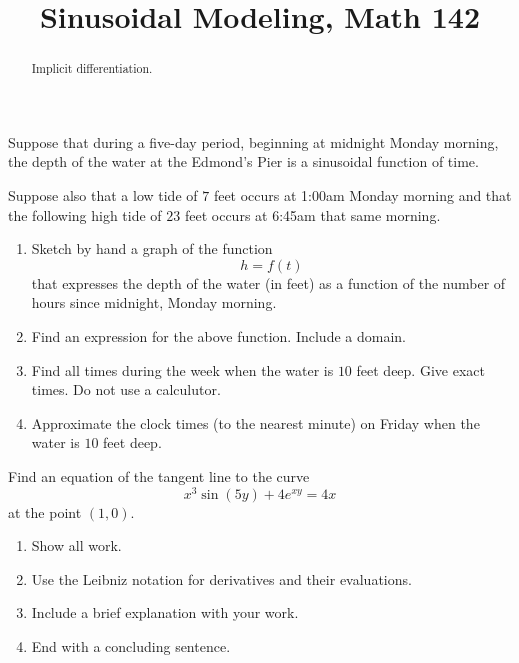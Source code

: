 \documentclass{ximera}
\title{Sinusoidal Modeling, Math 142}
\begin{document}
\begin{abstract}
Implicit differentiation.
\end{abstract}
\maketitle



\begin{question} \label{Qhhjklfghjfd}
Suppose that during a five-day period, beginning at midnight Monday morning, the depth of the water at the Edmond's Pier is a sinusoidal function of time.

Suppose also that a low tide of $7$ feet occurs at 1:00am Monday morning and that the following high tide of $23$ feet occurs at 6:45am that same morning.  

\begin{enumerate}
\item Sketch by hand a graph of the function
\[
   h = f(t)
\] 
that expresses the depth of the water (in feet) as a function of the number of hours since midnight, Monday morning.

\item Find an expression for the above function. Include a domain.

\item Find all times during the week when the water is $10$ feet deep. Give exact times. Do not use a calculutor.

\item Approximate the clock times (to the nearest minute) on Friday when the water is $10$ feet deep.

\end{enumerate}
\end{question}


\begin{question}  \label{Qgghghnbnvxbvvb}
Find an equation of the tangent line to the curve
\[
   x^3\sin(5y) + 4e^{xy} = 4x
\]
at the point $(1,0)$.

\begin{enumerate}
\item Show all work.

\item Use the Leibniz notation for derivatives and their evaluations.

\item Include a brief explanation with your work.

\item End with a concluding sentence.
\end{enumerate}
\end{question} 
\end{document}
